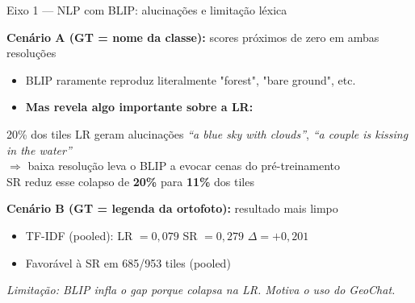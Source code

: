 \documentclass[aspectratio=169]{beamer}
\begin{document}
\begin{frame}{Eixo 1 — NLP com BLIP: alucinações e limitação léxica}

  \textbf{Cenário A (GT = nome da classe):} scores próximos de zero em ambas resoluções
  \begin{itemize}
    \item BLIP raramente reproduz literalmente "forest", "bare ground", etc.
    \item \textbf{Mas revela algo importante sobre a LR:}
  \end{itemize}

  \vspace{0.3em}
  \begin{block}{20\% dos tiles LR geram alucinações}
    \textit{``a blue sky with clouds''}, \textit{``a couple is kissing in the water''}\\
    $\Rightarrow$ baixa resolução leva o BLIP a evocar cenas do pré-treinamento\\
    SR reduz esse colapso de \textbf{20\%} para \textbf{11\%} dos tiles
  \end{block}

  \vspace{0.4em}
  \textbf{Cenário B (GT = legenda da ortofoto):} resultado mais limpo
  \begin{itemize}
    \item TF-IDF (pooled): LR $= 0{,}079$ \quad SR $= 0{,}279$ \quad $\Delta = +0{,}201$
    \item Favorável à SR em 685/953 tiles (pooled)
  \end{itemize}

  \vspace{0.3em}
  \small\textit{Limitação: BLIP infla o gap porque colapsa na LR. Motiva o uso do GeoChat.}

\end{frame}
\end{document}
